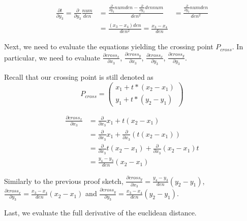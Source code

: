 \documentclass[fleqn]{article}
\begin{document}
\begin{equation}
\begin{aligned}
    \frac{\partial t}{\partial y_3} = \frac{\partial}{\partial y_3} \frac{num}{den}
    &= \frac{\frac{\partial}{\partial y_3}num den - \frac{\partial}{\partial y_3} den num}{den^2}
    &= \frac{\frac{\partial}{\partial y_3}num den}{den^2} \\
    &= \frac{(x_3 - x_4) den}{den^2} = \frac{x_3 - x_4}{den}
\end{aligned}
\end{equation}

Next, we need to evaluate the equations yielding the crossing point $P_{cross}$.
In particular, we need to evaluate
$\frac{\partial cross_x}{\partial x_3}$, $\frac{\partial cross_y}{\partial x_3}$,
$\frac{\partial cross_x}{\partial y_3}$, $\frac{\partial cross_y}{\partial y_3}$.

Recall that our crossing point is still denoted as
$$P_{cross} = \begin{pmatrix} x_1 + t * (x_2 - x_1) \\ y_1 + t * (y_2 - y_1) \end{pmatrix}$$

\begin{equation}
\begin{aligned}
    \frac{\partial cross_x}{\partial x_3}
    &= \frac{\partial}{\partial x_3} x_1 + t (x_2 - x_1)\\
    &= \frac{\partial}{\partial x_3} x_1 + \frac{\partial}{\partial x_3} (t (x_2 - x_1))\\
    &= \frac{\partial}{\partial x_3} t (x_2 - x_1) + \frac{\partial}{\partial x_3} (x_2 - x_1) t\\
    &= \frac{y_4 - y_3}{den} (x_2 - x_1)
\end{aligned}
\end{equation}

Similarly to the previous proof sketch, $\frac{\partial cross_y}{\partial x_3} = \frac{y_4 - y_3}{den} (y_2 - y_1)$,\\
$\frac{\partial cross_x}{\partial y_3} = \frac{x_3 - x_4}{den} (x_2 - x_1)$ and
$\frac{\partial cross_y}{\partial y_3} = \frac{x_3 - x_4}{den} (y_2 - y_1)$.

Last, we evaluate the full derivative of the euclidean distance.
\end{document}
